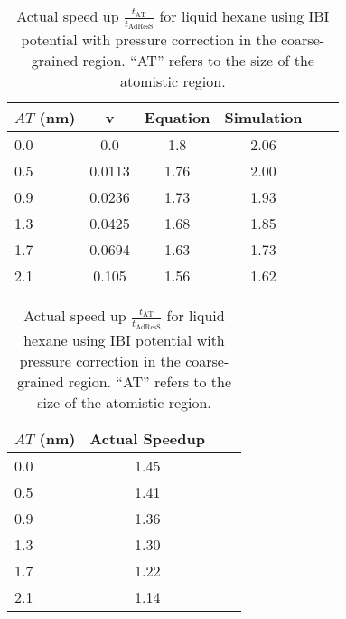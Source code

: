 \documentclass[a4paper,preprint,unsortedaddress]{revtex4-1}
\begin{document}
\begin{table}[htb]
\centering
\begin{minipage}{0.48\textwidth}
\sffamily
\begin{tabular}{l*{5}{c}}
\hline \hline
 \bfseries $AT$ (nm) & \bfseries v & \bfseries Equation & \bfseries Simulation \\
\midrule
\hline \hline
0.0 & 0.0 &  1.8 & 2.06\\
0.5 & 0.0113 & 1.76 & 2.00\\
0.9 & 0.0236 & 1.73 & 1.93\\
1.3 & 0.0425 & 1.68 & 1.85 \\
1.7 & 0.0694 & 1.63 & 1.73\\
2.1 & 0.105 & 1.56 & 1.62\\ \bottomrule
\hline \hline
\end{tabular}
\caption{Comparison of speed up for liquid hexane using IBI potential with pressure correction in the coarse-grained region, calculated using Eq. 9 and from AdResS simulation.}
\label{hexane}
\end{minipage}%
\hfill
\begin{minipage}{0.48\textwidth}
\centering
\sffamily
\begin{tabular}{l*{3}{c}}
\toprule
\hline \hline
 \bfseries $AT$ (nm) & \bfseries Actual Speedup \\
\midrule
\hline \hline
0.0 & 1.45\\
0.5 & 1.41  \\
0.9 & 1.36\\
1.3 & 1.30 \\
1.7 & 1.22\\
2.1 & 1.14\\ \bottomrule
\hline \hline
\end{tabular}
\caption{{Actual speed up $\frac{t_\text{AT}}{t_\text{AdResS}}$ for liquid hexane using IBI potential with pressure correction in the coarse-grained region. ``AT'' refers to the size of the atomistic region.}}
\label{hexane1}
\end{minipage}
\end{table}
\end{document}
